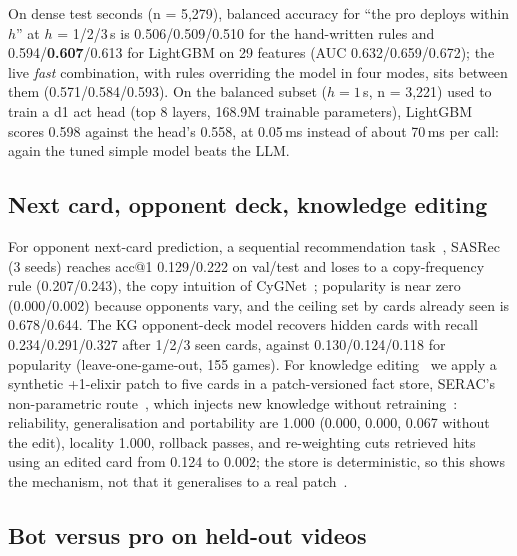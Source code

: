 On dense test seconds (n = 5,279), balanced accuracy for ``the pro deploys within $h$'' at $h$ = 1/2/3\,s is 0.506/0.509/0.510 for the hand-written rules and 0.594/\textbf{0.607}/0.613 for LightGBM on 29 features (AUC 0.632/0.659/0.672); the live \emph{fast} combination, with rules overriding the model in four modes, sits between them (0.571/0.584/0.593). %
On the balanced subset ($h=1$\,s, n = 3,221) used to train a d1 act head (top 8 layers, 168.9M trainable parameters), LightGBM scores 0.598 against the head's 0.558, at 0.05\,ms instead of about 70\,ms per call: again the tuned simple model beats the LLM. %

\subsection{Next card, opponent deck, knowledge editing}

For opponent next-card prediction, a sequential recommendation task~\cite{kang2018sasrec,lim2026l14}, SASRec (3 seeds) reaches acc@1 0.129/0.222 on val/test and loses to a copy-frequency rule (0.207/0.243), the copy intuition of CyGNet~\cite{zhu2021cygnet,cap6938L06C}; popularity is near zero (0.000/0.002) because opponents vary, and the ceiling set by cards already seen is 0.678/0.644. The KG opponent-deck model recovers hidden cards with recall 0.234/0.291/0.327 after 1/2/3 seen cards, against 0.130/0.124/0.118 for popularity (leave-one-game-out, 155 games). %
For knowledge editing~\cite{yao2023editingsurvey,lim2026l17} we apply a synthetic +1-elixir patch to five cards in a patch-versioned fact store, SERAC's non-parametric route~\cite{mitchell2022serac}, which injects new knowledge without retraining~\cite{lim2026l18}: reliability, generalisation and portability are 1.000 (0.000, 0.000, 0.067 without the edit), locality 1.000, rollback passes, and re-weighting cuts retrieved hits using an edited card from 0.124 to 0.002; the store is deterministic, so this shows the mechanism, not that it generalises to a real patch~\cite{yang2025mirage}. %

\subsection{Bot versus pro on held-out videos}

